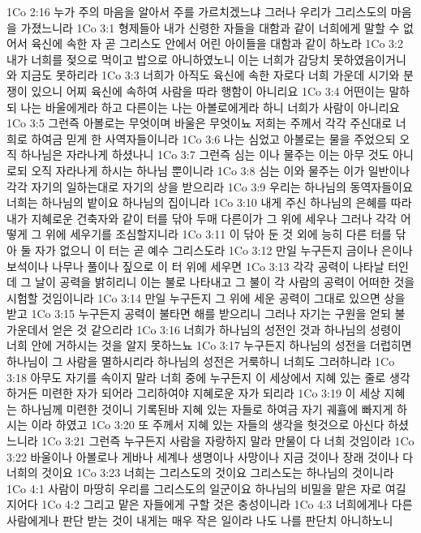 1Co 2:16  누가 주의 마음을 알아서 주를 가르치겠느냐 그러나 우리가 그리스도의 마음을 가졌느니라
1Co 3:1  형제들아 내가 신령한 자들을 대함과 같이 너희에게 말할 수 없어서 육신에 속한 자 곧 그리스도 안에서 어린 아이들을 대함과 같이 하노라
1Co 3:2  내가 너희를 젖으로 먹이고 밥으로 아니하였노니 이는 너희가 감당치 못하였음이거니와 지금도 못하리라
1Co 3:3  너희가 아직도 육신에 속한 자로다 너희 가운데 시기와 분쟁이 있으니 어찌 육신에 속하여 사람을 따라 행함이 아니리요
1Co 3:4  어떤이는 말하되 나는 바울에게라 하고 다른이는 나는 아볼로에게라 하니 너희가 사람이 아니리요
1Co 3:5  그런즉 아볼로는 무엇이며 바울은 무엇이뇨 저희는 주께서 각각 주신대로 너희로 하여금 믿게 한 사역자들이니라
1Co 3:6  나는 심었고 아볼로는 물을 주었으되 오직 하나님은 자라나게 하셨나니
1Co 3:7  그런즉 심는 이나 물주는 이는 아무 것도 아니로되 오직 자라나게 하시는 하나님 뿐이니라
1Co 3:8  심는 이와 물주는 이가 일반이나 각각 자기의 일하는대로 자기의 상을 받으리라
1Co 3:9  우리는 하나님의 동역자들이요 너희는 하나님의 밭이요 하나님의 집이니라
1Co 3:10  내게 주신 하나님의 은혜를 따라 내가 지혜로운 건축자와 같이 터를 닦아 두매 다른이가 그 위에 세우나 그러나 각각 어떻게 그 위에 세우기를 조심할지니라
1Co 3:11  이 닦아 둔 것 외에 능히 다른 터를 닦아 둘 자가 없으니 이 터는 곧 예수 그리스도라
1Co 3:12  만일 누구든지 금이나 은이나 보석이나 나무나 풀이나 짚으로 이 터 위에 세우면
1Co 3:13  각각 공력이 나타날 터인데 그 날이 공력을 밝히리니 이는 불로 나타내고 그 불이 각 사람의 공력이 어떠한 것을 시험할 것임이니라
1Co 3:14  만일 누구든지 그 위에 세운 공력이 그대로 있으면 상을 받고
1Co 3:15  누구든지 공력이 불타면 해를 받으리니 그러나 자기는 구원을 얻되 불 가운데서 얻은 것 같으리라
1Co 3:16  너희가 하나님의 성전인 것과 하나님의 성령이 너희 안에 거하시는 것을 알지 못하느뇨
1Co 3:17  누구든지 하나님의 성전을 더럽히면 하나님이 그 사람을 멸하시리라 하나님의 성전은 거룩하니 너희도 그러하니라
1Co 3:18  아무도 자기를 속이지 말라 너희 중에 누구든지 이 세상에서 지혜 있는 줄로 생각하거든 미련한 자가 되어라 그리하여야 지혜로운 자가 되리라
1Co 3:19  이 세상 지혜는 하나님께 미련한 것이니 기록된바 지혜 있는 자들로 하여금 자기 궤휼에 빠지게 하시는 이라 하였고
1Co 3:20  또 주께서 지혜 있는 자들의 생각을 헛것으로 아신다 하셨느니라
1Co 3:21  그런즉 누구든지 사람을 자랑하지 말라 만물이 다 너희 것임이라
1Co 3:22  바울이나 아볼로나 게바나 세계나 생명이나 사망이나 지금 것이나 장래 것이나 다 너희의 것이요
1Co 3:23  너희는 그리스도의 것이요 그리스도는 하나님의 것이니라
1Co 4:1  사람이 마땅히 우리를 그리스도의 일군이요 하나님의 비밀을 맡은 자로 여길지어다
1Co 4:2  그리고 맡은 자들에게 구할 것은 충성이니라
1Co 4:3  너희에게나 다른 사람에게나 판단 받는 것이 내게는 매우 작은 일이라 나도 나를 판단치 아니하노니
